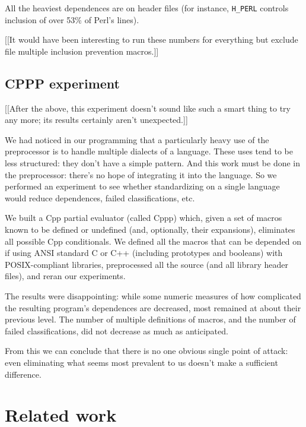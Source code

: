 \documentclass[10pt]{article}
\begin{document}
        All the heaviest dependences are on header files (for instance,
          \verb|H_PERL| controls inclusion of over 53\% of Perl's lines).

        [[It would have been interesting to run these numbers for everything
          but exclude file multiple inclusion prevention macros.]]


\subsection{CPPP experiment}

    [[After the above, this experiment doesn't sound like such a smart thing
      to try any more; its results certainly aren't unexpected.]]

    We had noticed in our programming that a particularly heavy use of the
      preprocessor is to handle multiple dialects of a language.  These uses
      tend to be less structured:  they don't have a simple pattern.  And
      this work must be done in the preprocessor:  there's no hope of
      integrating it into the language.  So we performed an experiment to
      see whether standardizing on a single language would reduce
      dependences, failed classifications, etc.

    We built a Cpp partial evaluator (called Cppp) which, given a set of
      macros known to be defined or undefined (and, optionally, their
      expansions), eliminates all possible Cpp conditionals.  We defined
      all the macros that can be depended on if using ANSI standard C or
      C++ (including prototypes and booleans) with POSIX-compliant
      libraries, preprocessed all the source (and 
      all library header files), and reran our experiments.

    The results were disappointing:  while some numeric measures of how
      complicated the resulting program's dependences are decreased, most
      remained at about their previous level.  The number of multiple
      definitions of macros, and the number of failed classifications, did
      not decrease as much as anticipated.

    From this we can conclude that there is no one obvious single point of
      attack:  even eliminating what seems most prevalent to us doesn't
      make a sufficient difference.



\section{Related work}
\label{sec:related}
\end{document}
